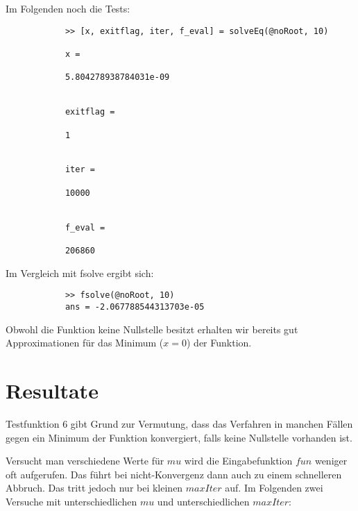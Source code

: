 \documentclass[11pt,titlepage]{article}
\begin{document}
		Im Folgenden noch die Tests:
		
		\begin{lstlisting}
			>> [x, exitflag, iter, f_eval] = solveEq(@noRoot, 10)
			
			x =
			
			5.804278938784031e-09
			
			
			exitflag =
			
			1
			
			
			iter =
			
			10000
			
			
			f_eval =
			
			206860
		\end{lstlisting}
		
		Im Vergleich mit fsolve ergibt sich:
		
		\begin{lstlisting}
			>> fsolve(@noRoot, 10)
			ans = -2.067788544313703e-05
		\end{lstlisting}
	
			Obwohl die Funktion keine Nullstelle besitzt erhalten wir bereits gut Approximationen für das Minimum ($x=0$) der Funktion. 

		
	\section{Resultate}
		Testfunktion 6 gibt Grund zur Vermutung, dass das Verfahren in manchen Fällen gegen ein Minimum der Funktion konvergiert, falls keine Nullstelle vorhanden ist. 
		
		
		Versucht man verschiedene Werte für $mu$ wird die Eingabefunktion $fun$ weniger oft aufgerufen. Das führt bei nicht-Konvergenz dann auch zu einem schnelleren Abbruch. 
		Das tritt jedoch nur bei kleinen $maxIter$ auf.
		Im Folgenden zwei Versuche mit unterschiedlichen $mu$ und unterschiedlichen $maxIter$:
		
\end{document}

